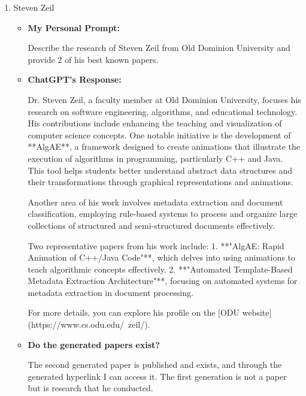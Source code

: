 \documentclass[12pt]{article}
\begin{document}
\begin{enumerate}
\begin{itemize}
        Yes, they do. When I click on the hyperlinks embedded in the ChatGPT response, I am taken to Michele Weigle's personal website, where I can find links to the published papers.
        
    \end{itemize}

    \item Steven Zeil
    \begin{itemize}
        \item \textbf{My Personal Prompt:}

        Describe the research of Steven Zeil from Old Dominion University and provide 2 of his best known papers.
        
        \item \textbf{ChatGPT's Response:}

        Dr. Steven Zeil, a faculty member at Old Dominion University, focuses his research on software engineering, algorithms, and educational technology. His contributions include enhancing the teaching and visualization of computer science concepts. One notable initiative is the development of **AlgAE**, a framework designed to create animations that illustrate the execution of algorithms in programming, particularly C++ and Java. This tool helps students better understand abstract data structures and their transformations through graphical representations and animations.

        Another area of his work involves metadata extraction and document classification, employing rule-based systems to process and organize large collections of structured and semi-structured documents effectively.
        
        Two representative papers from his work include:
        1. **"AlgAE: Rapid Animation of C++/Java Code"**, which delves into using animations to teach algorithmic concepts effectively.
        2. **"Automated Template-Based Metadata Extraction Architecture"**, focusing on automated systems for metadata extraction in document processing. 
        
        For more details, you can explore his profile on the [ODU website](https://www.cs.odu.edu/~zeil/).
        
        \item \textbf{Do the generated papers exist?}

        The second generated paper is published and exists, and through the generated hyperlink I can access it. The first generation is not a paper but is research that he conducted.
        

\end{itemize}
\end{enumerate}
\end{document}

